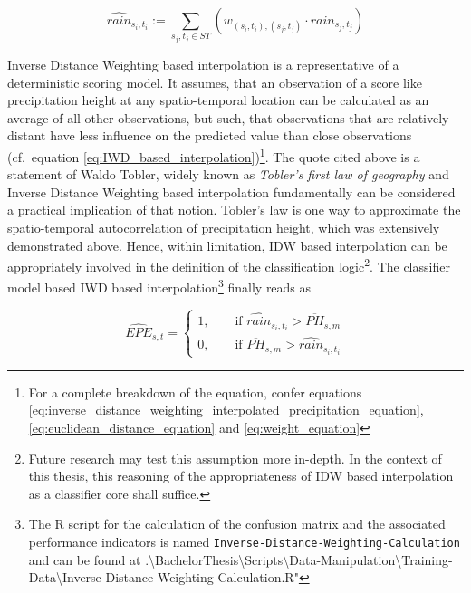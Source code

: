 \documentclass[
  12pt,
]{article}
\begin{document}
\pagebreak

\begin{mdframed}[leftline=true, topline=false, bottomline = false,rightline = true, frametitle={Inverse Distance Weighting based Interpolation}]

\begin{equation}\label{eq:IWD_based_interpolation}
\widehat{rain}_{s_i,t_i} := {\displaystyle \sum_{s_j,t_j\in ST}} \left(w_{(s_i,t_i),(s_j,t_j)} \cdot rain_{s_j,t_j}\right)
\end{equation}
\end{mdframed}

Inverse Distance Weighting based interpolation is a representative of a
deterministic scoring model. It assumes, that an observation of a score
like precipitation height at any spatio-temporal location can be
calculated as an average of all other observations, but such, that
observations that are relatively distant have less influence on the
predicted value than close observations (cf.~equation
\ref{eq:IWD_based_interpolation})\footnote{For a complete breakdown of the equation, confer equations \ref{eq:inverse_distance_weighting_interpolated_precipitation_equation},\ref{eq:euclidean_distance_equation} and \ref{eq:weight_equation}}.
The quote cited above is a statement of Waldo Tobler, widely known as
\textit{Tobler's first law of geography} and Inverse Distance Weighting
based interpolation fundamentally can be considered a practical
implication of that notion. Tobler's law is one way to approximate the
spatio-temporal autocorrelation of precipitation height, which was
extensively demonstrated above. Hence, within limitation, IDW based
interpolation can be appropriately involved in the definition of the
classification
logic\footnote{Future research may test this assumption more in-depth. In the context of this thesis, this reasoning of the appropriateness of IDW based interpolation as a classifier core shall suffice.}.
The classifier model based IWD based
interpolation\footnote{The R script for the calculation of the confusion matrix and the associated performance indicators is named \texttt{Inverse-Distance-Weighting-Calculation} and can be found at .\textbackslash BachelorThesis\textbackslash Scripts\textbackslash Data-Manipulation\textbackslash Training-Data\textbackslash Inverse-Distance-Weighting-Calculation.R"}
finally reads as

\begin{equation}\label{eq:classifier_layer_gamm}
\widehat{EPE}_{s,t} =
\begin{cases}   
1, \qquad \text{if } \widehat{rain}_{s_i,t_i} > \overline{PH}_{s,m} \\
0, \qquad \text{if } \overline{PH}_{s,m} > \widehat{rain}_{s_i,t_i}
\end{cases}
\end{equation}
\end{document}
